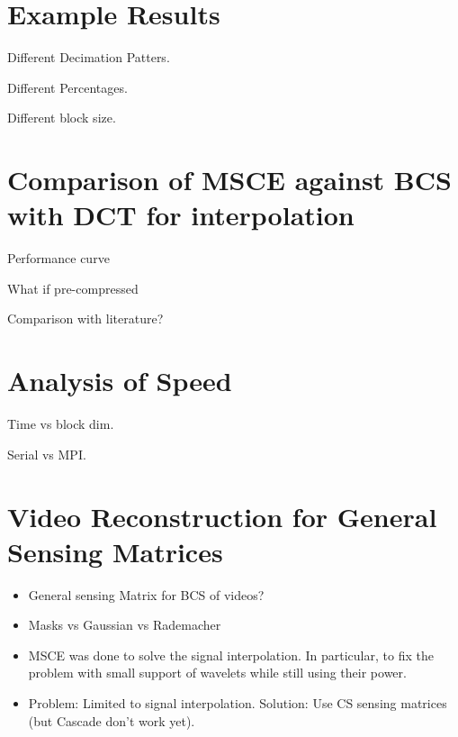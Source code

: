 \section{Example Results}
Different Decimation Patters. 

Different Percentages. 

Different block size.

\section{Comparison of MSCE against BCS with DCT for interpolation}

Performance curve

What if pre-compressed

Comparison with literature?

\section{Analysis of Speed}
Time vs block dim.

Serial vs MPI.


\section{Video Reconstruction for General Sensing Matrices}

\begin{itemize}
\item General sensing Matrix for BCS of videos?
\item Masks vs Gaussian vs Rademacher
\item MSCE was done to solve the signal interpolation. In particular, to fix the problem with small support of wavelets while still using their power.
\item Problem: Limited to signal interpolation. Solution: Use CS sensing matrices (but Cascade don't work yet).
\end{itemize}
